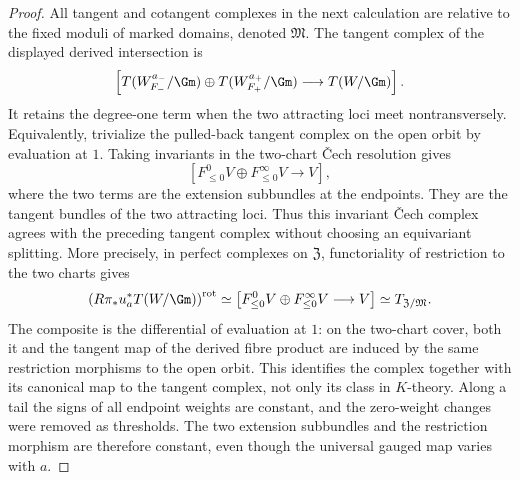 \begin{proof}
All tangent and cotangent complexes in the next calculation are relative to
the fixed moduli of marked domains, denoted \(\mathfrak M\).  The tangent
complex of the displayed derived intersection is
\[
 \left[
  T(W_{F_-}^{a_-}/\Gm)\oplus T(W_{F_+}^{a_+}/\Gm)
  \longrightarrow T(W/\Gm)
 \right].
\]
It retains the degree-one term when the two attracting loci meet
nontransversely.  Equivalently, trivialize the pulled-back tangent complex on
the open orbit by evaluation at \(1\).  Taking invariants in the two-chart
\v{C}ech resolution gives
\[
 \left[
  F^0_{\leq0}V\oplus F^\infty_{\leq0}V\longrightarrow V
 \right],
\]
where the two terms are the extension subbundles at the endpoints.  They are
the tangent bundles of the two attracting loci.  Thus this invariant
\v{C}ech complex agrees with the preceding tangent complex without choosing
an equivariant splitting.  More precisely, in perfect complexes on
\(\mathfrak Z\), functoriality of restriction to the two charts gives
\[
 \left(R\pi_*u_a^*T(W/\Gm)\right)^{\mathrm{rot}}
 \simeq
 \left[F^0_{\leq0}V\oplus F^\infty_{\leq0}V\longrightarrow V\right]
 \simeq T_{\mathfrak Z/\mathfrak M}.
\]
The composite is the differential of evaluation at \(1\): on the two-chart
cover, both it and the tangent map of the derived fibre product are induced by
the same restriction morphisms to the open orbit.  This identifies the
complex together with its canonical map to the tangent complex, not only its
class in \(K\)-theory.  Along a tail the signs of all endpoint weights are
constant, and the zero-weight changes were removed as thresholds.  The two
extension subbundles and the restriction morphism are therefore constant,
even though the universal gauged map varies with \(a\).


\end{proof}
